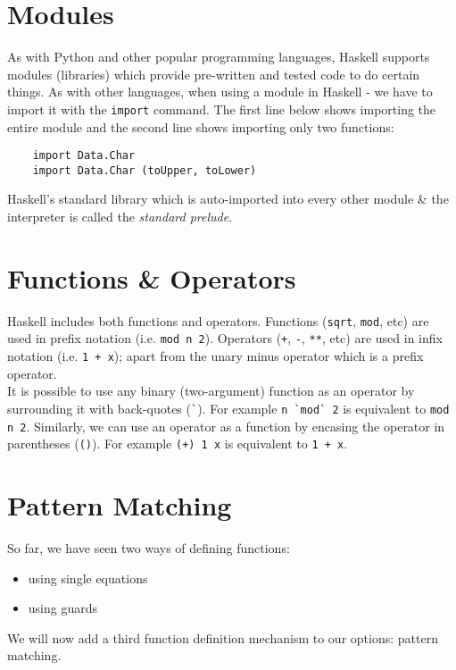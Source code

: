 

\section{Modules}
As with Python and other popular programming languages, Haskell supports modules (libraries) which provide pre-written and tested code to do certain things. As with other languages, when using a module in Haskell - we have to import it with the \verb|import| command. The first line below shows importing the entire module and the second line shows importing only two functions:
\begin{verbatim}
    import Data.Char
    import Data.Char (toUpper, toLower)
\end{verbatim}

Haskell's standard library which is auto-imported into every other module \& the interpreter is called the \textit{standard prelude}. 

\section{Functions \& Operators}
Haskell includes both functions and operators. Functions (\verb|sqrt|, \verb|mod|, etc) are used in prefix notation (i.e. \verb|mod n 2|). Operators (\verb|+|, \verb|-|, \verb|**|, etc) are used in infix notation (i.e. \verb|1 + x|); apart from the unary minus operator which is a prefix operator. \\

It is possible to use any binary (two-argument) function as an operator by surrounding it with back-quotes (\verb|`|). For example \verb|n `mod` 2| is equivalent to \verb|mod n 2|. Similarly, we can use an operator as a function by encasing the operator in parentheses (\verb|()|). For example \verb|(+) 1 x| is equivalent to \verb|1 + x|.  

\section{Pattern Matching}
So far, we have seen two ways of defining functions:
\begin{itemize}
    \item using single equations
    \item using guards
\end{itemize}
We will now add a third function definition mechanism to our options: pattern matching. \\

